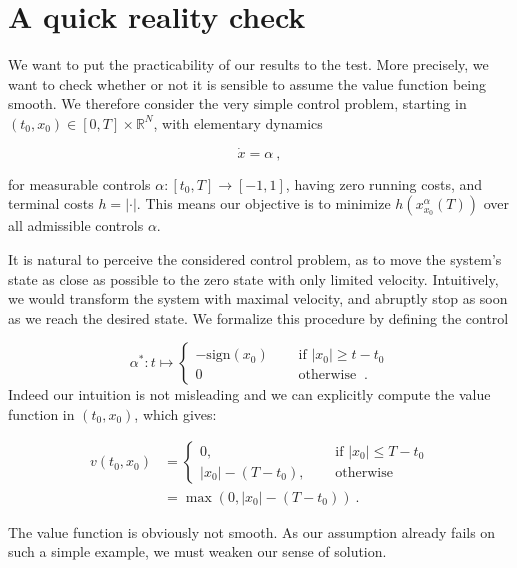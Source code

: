 
	\section{A quick reality check}
	
	\label{non-smooth}
	
	We want to put the practicability of our results to the test. More precisely, we want to check whether or not it is sensible to assume the value function being smooth. We therefore consider the very simple control problem, starting in $ (t_0, x_0) \in \left[ 0 , T \right] \times \mathbb{R}^N $, with elementary dynamics
	
	\begin{equation*}
		\dot{x} = \alpha \ ,
	\end{equation*}
	
	for measurable controls $ \alpha : \left[ t_0, T \right] \to \left[-1, 1\right] $, having zero running costs, and terminal costs $ h = \lvert \cdot \rvert $. This means our objective is to minimize $ h(x^{\alpha}_{x_0}(T)) $ over all admissible controls $ \alpha $.
	
	It is natural to perceive the considered control problem, as to move the system's state as close as possible to the zero state with only limited velocity. Intuitively, we would transform the system with maximal velocity, and abruptly stop as soon as we reach the desired state. We formalize this procedure by defining the control
	
	\begin{equation*}
		\alpha^{*} : t \mapsto \begin{cases}
		-\text{sign}(x_0) \quad &\text{ if } \lvert x_0 \rvert \geq t - t_0 \\
		0 \quad &\text{ otherwise } \ .
		\end{cases}
	\end{equation*}
	Indeed our intuition is not misleading and we can explicitly compute the value function in $ (t_0, x_0) $, which gives:
	
	\begin{align*}
		v(t_0, x_0) &= \begin{cases}
		0, \quad &\text{ if } |x_0| \leq T - t_0 \\
		|x_0| - (T - t_0), \quad &\text{ otherwise }
		\end{cases} \\
		&= \max(0, |x_0| - (T - t_0)) \ .
	\end{align*}
	
	The value function is obviously not smooth. As our assumption already fails on such a simple example, we must weaken our sense of solution.
	
